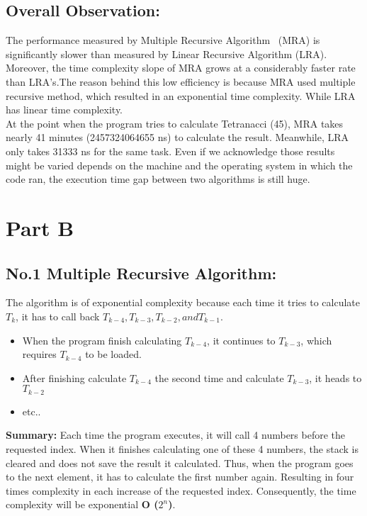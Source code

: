 \documentclass{article}
\begin{document}
\subsection*{Overall Observation:}
The performance measured by Multiple Recursive Algorithm \ (MRA) is significantly slower than measured by Linear Recursive Algorithm (LRA). Moreover, the time complexity slope of MRA grows at a considerably faster rate than LRA's.The reason behind this low efficiency is because MRA used multiple recursive method, which resulted in an exponential time complexity. While LRA has linear time complexity.  
\\
At the point when the program tries to calculate Tetranacci (45), MRA takes nearly 41 minutes (2457324064655 ns) to calculate the result. Meanwhile, LRA only takes 31333 ns for the same task. Even if we acknowledge those results might be varied depends on the machine and the operating system in which the code ran, the execution time gap between two algorithms is still huge.

\section*{Part B}%
\subsection*{No.1 Multiple Recursive Algorithm:}
The algorithm is of exponential complexity because each time it tries to calculate $T_k$, it has to call back $T_{k-4}, T_{k-3}, T_{k-2}, and T_{k-1}$.
\begin{itemize}
\item[]When the program finish calculating $T_{k-4}$, it continues to $T_{k-3}$, which requires $T_{k-4}$ to be loaded.
\item[]After finishing calculate $T_{k-4}$ the second time and calculate $T_{k-3}$, it heads to $T_{k-2}$
\item[]etc..
\end{itemize}

\textbf{Summary:} Each time the program executes, it will call 4 numbers before the requested index. When it finishes calculating one of these 4 numbers, the stack is cleared and does not save the result it calculated. Thus, when the program goes to the next element, it has to calculate the first number again. Resulting in four times complexity in each increase of the requested index. Consequently, the time complexity will be exponential \textbf{O ($2^n$)}.
\end{document}
